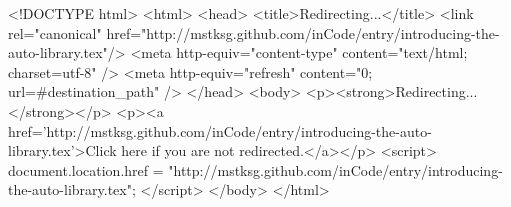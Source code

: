 <!DOCTYPE html>
<html>
<head>
<title>Redirecting...</title>
<link rel="canonical" href="http://mstksg.github.com/inCode/entry/introducing-the-auto-library.tex"/>
<meta http-equiv="content-type" content="text/html; charset=utf-8" />
<meta http-equiv="refresh" content="0; url=#{destination_path}" />
</head>
<body>
  <p><strong>Redirecting...</strong></p>
  <p><a href='http://mstksg.github.com/inCode/entry/introducing-the-auto-library.tex'>Click here if you are not redirected.</a></p>
  <script>
    document.location.href = "http://mstksg.github.com/inCode/entry/introducing-the-auto-library.tex";
  </script>
</body>
</html>

